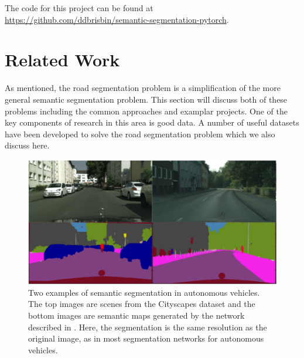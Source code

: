 \documentclass[10pt,twocolumn,letterpaper]{article}
\begin{document}
The code for this project can be found at \url{https://github.com/ddbrisbin/semantic-segmentation-pytorch}.

\section{Related Work}
As mentioned, the road segmentation problem is a simplification of the more general semantic segmentation problem. This section will discuss both of these problems including the common approaches and examplar projects. One of the key components of research in this area is good data. A number of useful datasets have been developed to solve the road segmentation problem which we also discuss here.

\begin{figure}[t]
\begin{center}
    \includegraphics[width=\linewidth]{images/sampleseg.png}
\end{center}
   \caption{Two examples of semantic segmentation in autonomous vehicles. The top images are scenes from the Cityscapes dataset and the bottom images are semantic maps generated by the network described in \cite{Treml18}. Here, the segmentation is the same resolution as the original image, as in most segmentation networks for autonomous vehicles.}
\label{fig:sampleseg}
\end{figure}
\end{document}

